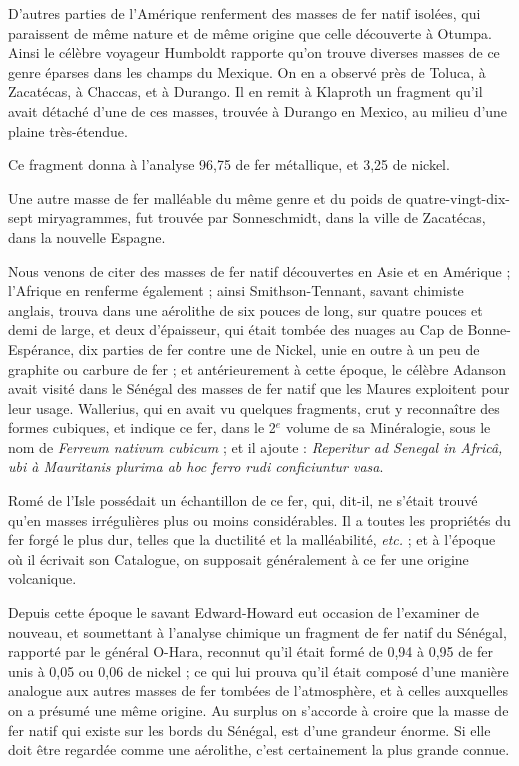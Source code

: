 \documentclass[a4paper, 12pt, oneside, french]{article}
\begin{document}
D'autres parties de l'Amérique renferment des masses de fer natif isolées, qui paraissent de même nature et de même origine que celle découverte à Otumpa. Ainsi le célèbre voyageur Humboldt rapporte qu'on trouve diverses masses de ce genre éparses dans les champs du Mexique. On en a observé près de Toluca, à Zacatécas, à Chaccas, et à Durango. Il en remit à Klaproth un fragment qu'il avait détaché d'une de ces masses, trouvée à Durango en Mexico, au milieu d'une plaine très-étendue.

Ce fragment donna à l'analyse 96,75 de fer métallique, et 3,25 de nickel.

Une autre masse de fer malléable du même genre et du poids de quatre-vingt-dix-sept miryagrammes, fut trouvée par Sonneschmidt, dans la ville de Zacatécas, dans la nouvelle Espagne.

Nous venons de citer des masses de fer natif découvertes en Asie et en Amérique ; l'Afrique en renferme également ; ainsi Smithson-Tennant, savant chimiste anglais, trouva dans une aérolithe de six pouces de long, sur quatre pouces et demi de large, et deux d'épaisseur, qui était tombée des nuages au Cap de Bonne-Espérance, dix parties de fer contre une de Nickel, unie en outre à un peu de graphite ou carbure de fer ; et antérieurement à cette époque, le célèbre Adanson avait visité dans le Sénégal des masses de fer natif que les Maures exploitent pour leur usage. Wallerius, qui en avait vu quelques fragments, crut y reconnaître des formes cubiques, et indique ce fer, dans le 2$^{e}$ volume de sa Minéralogie, sous le nom de \emph{Ferreum nativum cubicum} ; et il ajoute : \emph{Reperitur ad Senegal in Africâ, ubi à Mauritanis plurima ab hoc ferro rudi conficiuntur vasa}.

Romé de l'Isle possédait un échantillon de ce fer, qui, dit-il, ne s'était trouvé qu'en masses irrégulières plus ou moins considérables. Il a toutes les propriétés du fer forgé le plus dur, telles que la ductilité et la malléabilité, \emph{etc.} ; et à l'époque où il écrivait son Catalogue, on supposait généralement à ce fer une origine volcanique.

Depuis cette époque le savant Edward-Howard eut occasion de l'examiner de nouveau, et soumettant à l'analyse chimique un fragment de fer natif du Sénégal, rapporté par le général O-Hara, reconnut qu'il était formé de 0,94 à 0,95 de fer unis à 0,05 ou 0,06 de nickel ; ce qui lui prouva qu'il était composé d'une manière analogue aux autres masses de fer tombées de l'atmosphère, et à celles auxquelles on a présumé une même origine. Au surplus on s'accorde à croire que la masse de fer natif qui existe sur les bords du Sénégal, est d'une grandeur énorme. Si elle doit être regardée comme une aérolithe, c'est certainement la plus grande connue.
\end{document}
